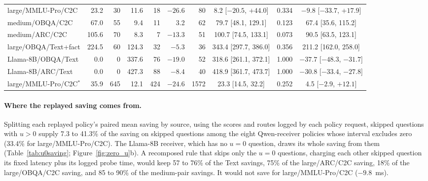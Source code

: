 \begin{table}[!htbp]
\begin{tabular*}{\linewidth}{@{}l@{\hspace{5pt}\extracolsep{\fill}}rrrrrrcrc@{}}
large/MMLU-Pro/C2C & 23.2 & 30 & 11.6 & 18 & $-26.6$ & 80 & 8.2 [$-20.5$, $+44.0$] & 0.334 & $-9.8$ [$-33.7$, $+17.9$]\\
medium/OBQA/C2C & 67.0 & 55 & 9.4 & 11 & 3.2 & 62 & 79.7 [48.1, 129.1] & 0.123 & 67.4 [35.6, 115.2]\\
medium/ARC/C2C & 105.6 & 70 & 8.3 & 7 & $-13.3$ & 51 & 100.7 [74.5, 133.1] & 0.073 & 90.5 [63.5, 123.1]\\
large/OBQA/Text+fact & 224.5 & 60 & 124.3 & 32 & $-5.3$ & 36 & 343.4 [297.7, 386.0] & 0.356 & 211.2 [162.0, 258.0]\\
Llama-8B/OBQA/Text & 0.0 & 0 & 337.6 & 76 & $-19.0$ & 52 & 318.6 [261.1, 372.1] & 1.000 & $-37.7$ [$-48.3$, $-31.7$]\\
Llama-8B/ARC/Text & 0.0 & 0 & 427.3 & 88 & $-8.4$ & 40 & 418.9 [361.7, 473.7] & 1.000 & $-30.8$ [$-33.4$, $-27.8$]\\
\midrule
large/MMLU-Pro/C2C$^\ast$ & 35.9 & 645 & 12.1 & 424 & $-24.6$ & 1572 & 23.3 [14.5, 32.2] & 0.252 & 4.5 [$-2.9$, $+12.1$]\\\bottomrule
\end{tabular*}
\end{table}

\paragraph{Where the replayed saving comes from.} Splitting each replayed policy's paired mean saving by source, using the scores and routes logged by each policy request, skipped questions with $u>0$ supply 7.3 to 41.3\% of the saving on skipped questions among the eight Qwen-receiver policies whose interval excludes zero (33.4\% for large/MMLU-Pro/C2C). The Llama-8B receiver, which has no $u=0$ question, draws its whole saving from them (Table~\ref{tab:u0saving}; Figure~\ref{fig:zero_u}b). A recomposed rule that skips only the $u=0$ questions, charging each other skipped question its fixed latency plus its logged probe time, would keep 57 to 76\% of the Text savings, 75\% of the large/ARC/C2C saving, 18\% of the large/OBQA/C2C saving, and 85 to 90\% of the medium-pair savings. It would not save for large/MMLU-Pro/C2C ($-9.8$~ms).

